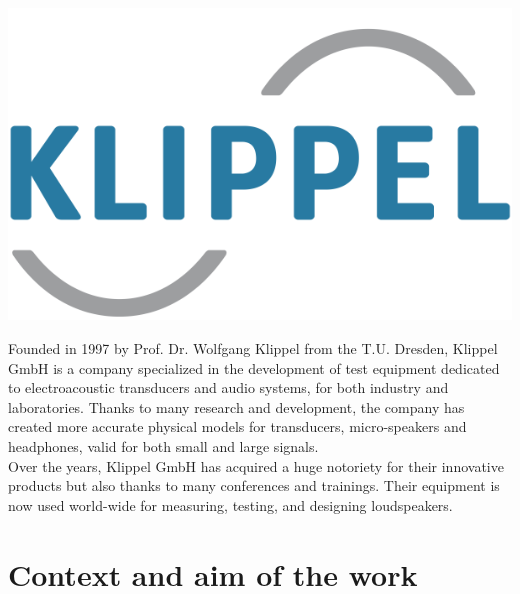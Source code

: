 \documentclass{report}
\begin{document}
\begin{minipage}{0.35\textwidth}
\centering
	\includegraphics[scale=0.2]{Preface/logo_klippel} 
    \captionsetup{hypcap=false} 
	\label{fig:lolo_klippel}
\end{minipage}
\begin{minipage}{0.65\textwidth}
Founded in 1997 by Prof. Dr. Wolfgang Klippel from the T.U. Dresden, Klippel GmbH is a company specialized in the development of test equipment dedicated to electroacoustic transducers and audio systems, for both industry and laboratories. Thanks to many research and development, the company has created more accurate physical models for transducers, micro-speakers and headphones, valid for both small and large signals.  \\
Over the years, Klippel GmbH has acquired a huge notoriety for their innovative products but also thanks to many conferences and trainings. Their equipment is now used world-wide for measuring, testing, and designing loudspeakers.
\end{minipage}


    
\section{Context and aim of the work}
\end{document}
